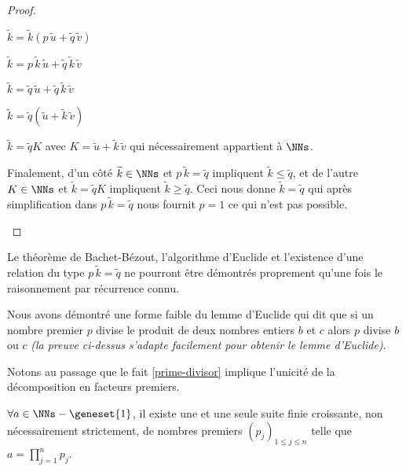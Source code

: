 \begin{proof}
\begin{itemize}[label=\small\textbullet]
		\smallskip
		\noindent
		$\widetilde{k} = \widetilde{k} (p \, \widetilde{u} + \widetilde{q} \, \widetilde{v})$
		
		\smallskip
		\noindent
		$\widetilde{k} = p \, \widetilde{k} \, \widetilde{u} + \widetilde{q} \, \widetilde{k} \, \widetilde{v}$
		
		\smallskip
		\noindent
		$\widetilde{k} = \widetilde{q} \, \widetilde{u} + \widetilde{q} \, \widetilde{k} \, \widetilde{v}$
		
		\smallskip
		\noindent
		$\widetilde{k} = \widetilde{q} (\widetilde{u} + \widetilde{k} \, \widetilde{v})$
		
		\smallskip
		\noindent
		$\widetilde{k} = \widetilde{q} K$ avec $K = \widetilde{u} + \widetilde{k} \, \widetilde{v}$ qui nécessairement appartient à $\NNs$.
		
		\smallskip
		\noindent
		Finalement,
		d'un côté $\widetilde{k} \in \NNs$ et $p \, \widetilde{k} = \widetilde{q}$ impliquent $\widetilde{k} \leq \widetilde{q}$,
		et de l'autre $K \in \NNs$ et $\widetilde{k} = \widetilde{q} K$ impliquent $\widetilde{k} \geq \widetilde{q}$.
		Ceci nous donne $\widetilde{k} = \widetilde{q}$ qui après simplification dans $p \, \widetilde{k} = \widetilde{q}$ nous fournit $p = 1$ ce qui n'est pas possible.
	\end{itemize}
\end{proof}


\begin{unproved}
	Le théorème de Bachet-Bézout, l'algorithme d'Euclide et l'existence d'une relation du type $p \, \widetilde{k} = \widetilde{q}$ ne pourront être démontrés proprement qu'une fois le raisonnement par récurrence connu.

\end{unproved}


\begin{remark}
	Nous avons démontré une forme faible du lemme d'Euclide qui dit que si un nombre premier $p$ divise le produit de deux nombres entiers $b$ et $c$ alors $p$ divise $b$ ou $c$ \emph{(la preuve ci-dessus s'adapte facilement pour obtenir le lemme d'Euclide)}.  
\end{remark}


Notons au passage que le fait \ref{prime-divisor} implique l'unicité de la décomposition en facteurs premiers.

\begin{fact} \label{prime-decompo}
	$\forall a \in \NNs - \geneset{1}$, il existe une et une seule suite finie croissante, non nécessairement strictement, de nombres premiers $(p_j)_{1 \leq j \leq n}$
	telle que $\displaystyle a = \prod_{j=1}^{n} p_j$. 
\end{fact}
	


